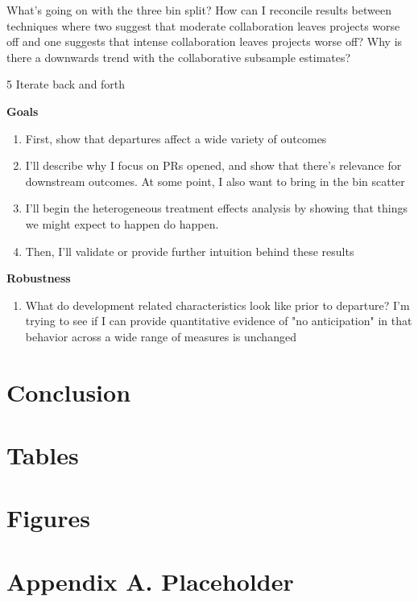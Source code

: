 \documentclass[12pt,notitlepage]{article}
\begin{document}
What's going on with the three bin split? How can I reconcile results between techniques where two suggest that moderate collaboration leaves projects worse off and one suggests that intense collaboration leaves projects worse off?
Why is there a downwards trend with the collaborative subsample estimates? 








5 Iterate back and forth


\textbf{Goals}
\begin{enumerate}
    \item First, show that departures affect a wide variety of outcomes
    \item I'll describe why I focus on PRs opened, and show that there's relevance for downstream outcomes. At some point, I also want to bring in the bin scatter
    \item I'll begin the heterogeneous treatment effects analysis by showing that things we might expect to happen do happen. 
    \item Then, I'll validate or provide further intuition behind these results
\end{enumerate}
\textbf{Robustness}
\begin{enumerate}
    \item What do development related characteristics look like prior to departure? I'm trying to see if I can provide quantitative evidence of "no anticipation" in that behavior across a wide range of measures is unchanged
\end{enumerate}

\section{Conclusion} \label{sec:conclusion}



\singlespacing


\clearpage

\onehalfspacing

\section*{Tables} \label{sec:tab}



\clearpage

\section*{Figures} \label{sec:fig}





\clearpage

\section*{Appendix A. Placeholder} \label{sec:appendixa}
\end{document}
